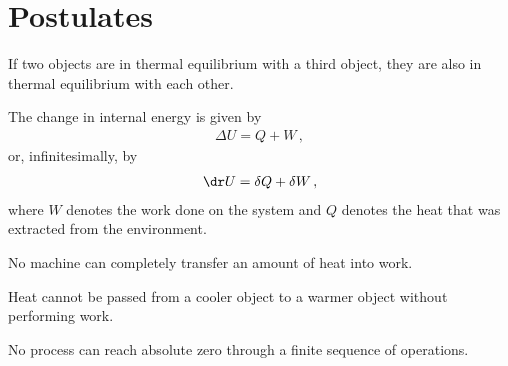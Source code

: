 \section{Postulates}

    \begin{axiom}
        If two objects are in thermal equilibrium with a third object, they are also in thermal equilibrium with each other.
    \end{axiom}
    \begin{axiom}
        The change in internal energy is given by
        \begin{gather}
            \label{thermo:first_law}
            \Delta U = Q + W\,,
        \end{gather}
        or, infinitesimally, by
        \begin{gather}
            \label{thermo:first_law_differential}
            \dr U = \delta Q + \delta W\,,
        \end{gather}
        where $W$ denotes the work done on the system and $Q$ denotes the heat that was extracted from the environment.
    \end{axiom}

    \begin{axiom}
        No machine can completely transfer an amount of heat into work.
    \end{axiom}
    \begin{axiom}
        Heat cannot be passed from a cooler object to a warmer object without performing work.
    \end{axiom}


    \begin{axiom}
        No process can reach absolute zero through a finite sequence of operations.
    \end{axiom}

